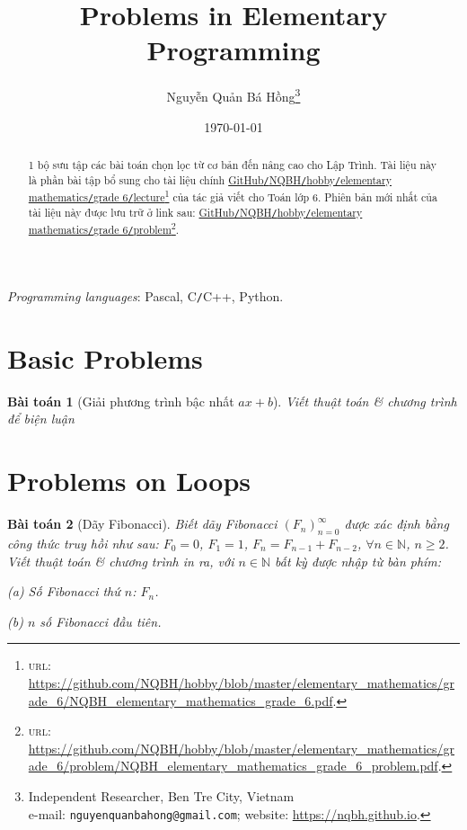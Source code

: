 \documentclass{article}
\title{Problems in Elementary Programming}
\author{Nguyễn Quản Bá Hồng\footnote{Independent Researcher, Ben Tre City, Vietnam\\e-mail: \texttt{nguyenquanbahong@gmail.com}; website: \url{https://nqbh.github.io}.}}
\date{\today}
\numberwithin{equation}{section}
\newtheorem{baitoan}{Bài toán}[section]
\begin{document}
\maketitle
\begin{abstract}
	1 bộ sưu tập các bài toán chọn lọc từ cơ bản đến nâng cao cho Lập Trình. Tài liệu này là phần bài tập bổ sung cho tài liệu chính \href{https://github.com/NQBH/hobby/blob/master/elementary_mathematics/grade_6/NQBH_elementary_mathematics_grade_6.pdf}{GitHub\texttt{/}NQBH\texttt{/}hobby\texttt{/}elementary mathematics\texttt{/}grade 6\texttt{/}lecture}\footnote{\textsc{url}: \url{https://github.com/NQBH/hobby/blob/master/elementary_mathematics/grade_6/NQBH_elementary_mathematics_grade_6.pdf}.} của tác giả viết cho Toán lớp 6. Phiên bản mới nhất của tài liệu này được lưu trữ ở link sau: \href{https://github.com/NQBH/hobby/blob/master/elementary_mathematics/grade_6/problem/NQBH_elementary_mathematics_grade_6_problem.pdf}{GitHub\texttt{/}NQBH\texttt{/}hobby\texttt{/}elementary mathematics\texttt{/}grade 6\texttt{/}problem}\footnote{\textsc{url}: \url{https://github.com/NQBH/hobby/blob/master/elementary_mathematics/grade_6/problem/NQBH_elementary_mathematics_grade_6_problem.pdf}.}.
\end{abstract}
\tableofcontents
\newpage


\textit{Programming languages}: Pascal, C\texttt{/}C++, Python.

\section{Basic Problems}

\begin{baitoan}[Giải phương trình bậc nhất $ax + b$]
	Viết thuật toán \& chương trình để biện luận 
\end{baitoan}



\section{Problems on Loops}

\begin{baitoan}[Dãy Fibonacci]
	Biết dãy Fibonacci $(F_n)_{n=0}^\infty$ được xác định bằng công thức truy hồi như sau: $F_0 = 0$, $F_1 = 1$, $F_{n} = F_{n-1} + F_{n-2}$, $\forall n\in\mathbb{N}$, $n\ge 2$. Viết thuật toán \& chương trình in ra, với $n\in\mathbb{N}$ bất kỳ được nhập từ bàn phím:
	\begin{enumerate*}
		\item[(a)] Số Fibonacci thứ $n$: $F_n$.
		\item[(b)] $n$ số Fibonacci đầu tiên.
	\end{enumerate*}
\end{baitoan}
\end{document}
